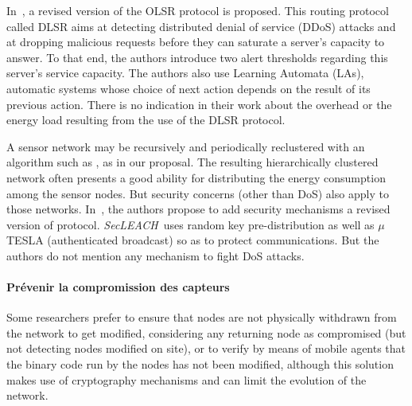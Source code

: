 In~\cite{MKASF10}, a revised version of the OLSR protocol is proposed.
This routing protocol called DLSR aims at detecting distributed denial of service (DDoS) attacks and at dropping malicious requests before they can saturate a server's capacity to answer.
To that end, the authors introduce two alert thresholds regarding this server's service capacity.
The authors also use Learning Automata (LAs), automatic systems whose choice of next action depends on the result of its previous action.
There is no indication in their work about the overhead or the energy load resulting from the use of the DLSR protocol.


A sensor network may be recursively and periodically reclustered with an algorithm such as \leach, as in our proposal.
The resulting hierarchically clustered network often presents a good ability for distributing the energy consumption among the sensor nodes.
But security concerns (other than DoS) also apply to those networks.
In~\cite{OFVWBDL07}, the authors propose to add security mechanisms \via a revised version of \leach protocol.
\textit{SecLEACH}\ uses random key pre-distribution as well as $\mu$TESLA (authenticated broadcast) so as to protect communications.
But the authors do not mention any mechanism to fight DoS attacks.


    \paragraph{Prévenir la compromission des capteurs}

Some researchers prefer to ensure that nodes are not physically withdrawn from the network to get modified\cite{Ho10}, considering any returning node as compromised (but not detecting nodes modified on site), or to verify by means of mobile agents that the binary code run by the nodes has not been modified\cite{HR13}, although this solution makes use of cryptography mechanisms and can limit the evolution of the network.

